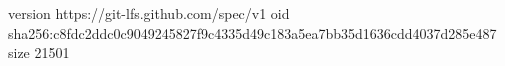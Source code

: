 version https://git-lfs.github.com/spec/v1
oid sha256:c8fdc2ddc0c9049245827f9c4335d49c183a5ea7bb35d1636cdd4037d285e487
size 21501
